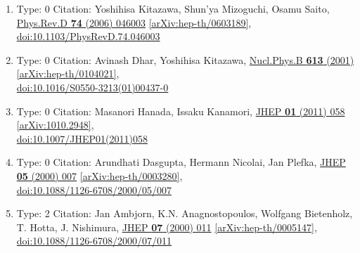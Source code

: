 \documentclass[a4paper,10pt]{article}
\begin{document}
\begin{enumerate}
\begin{enumerate}
  \item Type: 0 Citation: Yoshihisa Kitazawa, Shun'ya Mizoguchi, Osamu Saito, \href{https://www.doi.org/10.1103/PhysRevD.74.046003}{Phys.Rev.D {\bf 74} (2006) 046003}  \href{https://arxiv.org/abs/hep-th/0603189}{[arXiv:hep-th/0603189]},\\\href{https://www.doi.org/10.1103/PhysRevD.74.046003}{doi:10.1103/PhysRevD.74.046003}
  \item Type: 0 Citation: Avinash Dhar, Yoshihisa Kitazawa, \href{https://www.doi.org/10.1016/S0550-3213(01)00437-0}{Nucl.Phys.B {\bf 613} (2001) }  \href{https://arxiv.org/abs/hep-th/0104021}{[arXiv:hep-th/0104021]},\\\href{https://www.doi.org/10.1016/S0550-3213(01)00437-0}{doi:10.1016/S0550-3213(01)00437-0}
  \item Type: 0 Citation: Masanori Hanada, Issaku Kanamori, \href{https://www.doi.org/10.1007/JHEP01(2011)058}{JHEP {\bf 01} (2011) 058}  \href{https://arxiv.org/abs/1010.2948}{[arXiv:1010.2948]},\\\href{https://www.doi.org/10.1007/JHEP01(2011)058}{doi:10.1007/JHEP01(2011)058}
  \item Type: 0 Citation: Arundhati Dasgupta, Hermann Nicolai, Jan Plefka, \href{https://www.doi.org/10.1088/1126-6708/2000/05/007}{JHEP {\bf 05} (2000) 007}  \href{https://arxiv.org/abs/hep-th/0003280}{[arXiv:hep-th/0003280]},\\\href{https://www.doi.org/10.1088/1126-6708/2000/05/007}{doi:10.1088/1126-6708/2000/05/007}
  \item Type: 2 Citation: Jan Ambjorn, K.N. Anagnostopoulos, Wolfgang Bietenholz, T. Hotta, J. Nishimura, \href{https://www.doi.org/10.1088/1126-6708/2000/07/011}{JHEP {\bf 07} (2000) 011}  \href{https://arxiv.org/abs/hep-th/0005147}{[arXiv:hep-th/0005147]},\\\href{https://www.doi.org/10.1088/1126-6708/2000/07/011}{doi:10.1088/1126-6708/2000/07/011}

\end{enumerate}
\end{enumerate}
\end{document}
